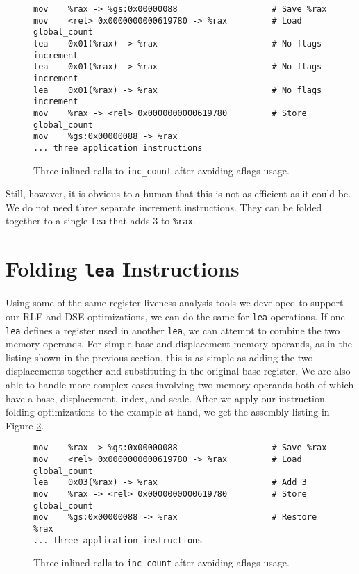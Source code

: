 \begin{figure}
\begin{verbatim}
mov    %rax -> %gs:0x00000088                   # Save %rax
mov    <rel> 0x0000000000619780 -> %rax         # Load global_count
lea    0x01(%rax) -> %rax                       # No flags increment
lea    0x01(%rax) -> %rax                       # No flags increment
lea    0x01(%rax) -> %rax                       # No flags increment
mov    %rax -> <rel> 0x0000000000619780         # Store global_count
mov    %gs:0x00000088 -> %rax 
... three application instructions
\end{verbatim}
\caption{Three inlined calls to {\tt inc\_count} after avoiding aflags usage.}
\label{fig:inscount_flags}
\end{figure}

Still, however, it is obvious to a human that this is not as efficient as it
could be.  We do not need three separate increment instructions.  They can be
folded together to a single {\tt lea} that adds 3 to {\tt \%rax}.

\section{Folding {\tt lea} Instructions}
\label{sec:fold_lea}

Using some of the same register liveness analysis tools we developed to support
our RLE and DSE optimizations, we can do the same for {\tt lea} operations.  If
one {\tt lea} defines a register used in another {\tt lea}, we can attempt to
combine the two memory operands.  For simple base and displacement memory
operands, as in the listing shown in the previous section, this is as simple as
adding the two displacements together and substituting in the original base
register.  We are also able to handle more complex cases involving two memory
operands both of which have a base, displacement, index, and scale.  After we
apply our instruction folding optimizations to the example at hand, we get the
assembly listing in Figure \ref{fig:inscount_lea}.

\begin{figure}
\begin{verbatim}
mov    %rax -> %gs:0x00000088                   # Save %rax
mov    <rel> 0x0000000000619780 -> %rax         # Load global_count
lea    0x03(%rax) -> %rax                       # Add 3
mov    %rax -> <rel> 0x0000000000619780         # Store global_count
mov    %gs:0x00000088 -> %rax                   # Restore %rax
... three application instructions
\end{verbatim}
\caption{Three inlined calls to {\tt inc\_count} after avoiding aflags usage.}
\label{fig:inscount_lea}
\end{figure}


